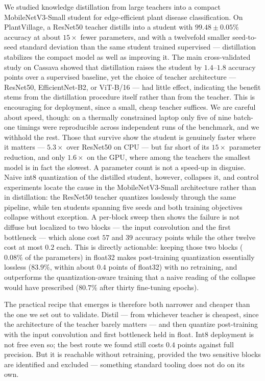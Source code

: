 \documentclass[conference]{IEEEtran}
\begin{document}
We studied knowledge distillation from large teachers into a compact
MobileNetV3-Small student for edge-efficient plant disease classification. On
PlantVillage, a ResNet50 teacher distills into a student with $99.48\pm0.05\%$
accuracy at about $15\times$ fewer parameters, and with a twelvefold smaller
seed-to-seed standard deviation than the same student trained supervised ---
distillation
stabilizes the compact model as well as improving it. The main cross-validated
study on Cassava
showed that distillation raises the student by $1.4$--$1.8$ accuracy points over
a supervised baseline, yet the choice of teacher architecture --- ResNet50,
EfficientNet-B2, or ViT-B/16 --- had little effect, indicating the benefit stems
from the distillation procedure itself rather than from the teacher. This is
encouraging for deployment, since a small, cheap teacher suffices. We are careful
about speed, though: on a thermally constrained laptop only five of nine batch-one
timings were reproducible across independent runs of the benchmark, and we withhold
the rest. Those that survive show the student is genuinely faster where it matters
--- $5.3\times$ over ResNet50 on CPU --- but far short of its $15\times$ parameter
reduction, and only $1.6\times$ on the GPU, where among the teachers the smallest
model is in fact the slowest. A parameter count is not a speed-up in disguise.
Naive int8
quantization of the distilled student, however, collapses it, and control
experiments locate the cause in the MobileNetV3-Small architecture rather than in
distillation: the ResNet50 teacher quantizes losslessly through the same
pipeline, while ten students spanning five seeds and both training objectives
collapse without exception. A per-block sweep then shows the failure is not
diffuse but localized to two blocks --- the input convolution and the first
bottleneck --- which alone cost $57$ and $39$ accuracy points while the other
twelve cost at most $0.2$ each. This is directly actionable: keeping those two
blocks ($0.08\%$ of the parameters) in float32 makes post-training quantization
essentially lossless ($83.9\%$, within about $0.4$ points of float32) with no
retraining, and outperforms the quantization-aware training that a naive reading
of the collapse would have prescribed ($80.7\%$ after thirty fine-tuning epochs).

The practical recipe that emerges is therefore both narrower and cheaper than the
one we set out to validate. Distil --- from whichever teacher is cheapest, since
the architecture of the teacher barely matters --- and then quantize
post-training with the input convolution and first bottleneck held in float. Int8
deployment is not free even so; the best route we found still costs $0.4$ points
against full precision. But it is reachable without retraining, provided the two
sensitive blocks are identified and excluded --- something standard tooling does
not do on its own.



\end{document}
